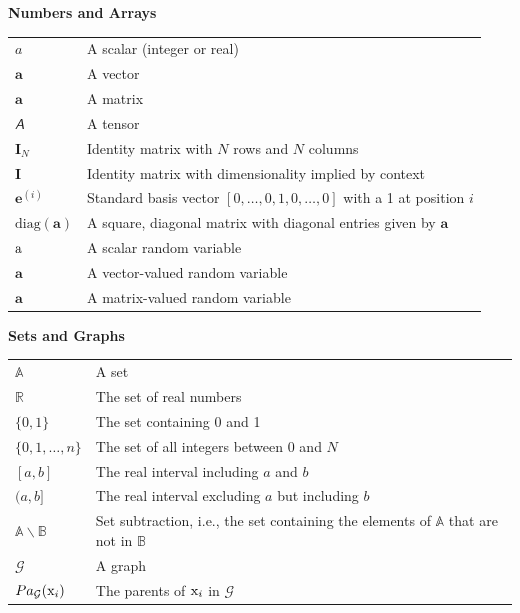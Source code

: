 \documentclass[twoside]{article}
\renewcommand{\arraystretch}{1.6}
\theoremstyle{plain}
\theoremstyle{definition}
\theoremstyle{plain}
\def\ra{{\textnormal{a}}}
\def\rva{{\mathbf{a}}}
\def\ervx{{\textnormal{x}}}
\def\va{{\bm{a}}}
\def\ve{{\bm{e}}}
\def\mI{{\bm{I}}}
\newcommand{\tens}[1]{\bm{\mathsfit{#1}}}
\def\tA{{\tens{A}}}
\def\gG{{\mathcal{G}}}
\def\sA{{\mathbb{A}}}
\def\sB{{\mathbb{B}}}
\newcommand{\R}{\mathbb{R}}
\newcommand{\parents}{Pa} %
\begin{document}
\centerline{\bf Numbers and Arrays}
\bgroup
\def\arraystretch{1.5}
\begin{tabular}{p{1in}p{3.25in}}
$\displaystyle a$ & A scalar (integer or real)\\
$\displaystyle \va$ & A vector\\
$\displaystyle \va$ & A matrix\\
$\displaystyle \tA$ & A tensor\\
$\displaystyle \mI_N$ & Identity matrix with $N$ rows and $N$ columns\\
$\displaystyle \mI$ & Identity matrix with dimensionality implied by context\\
$\displaystyle \ve^{(i)}$ & Standard basis vector $[0,\dots,0,1,0,\dots,0]$ with a 1 at position $i$\\
$\displaystyle \text{diag}(\va)$ & A square, diagonal matrix with diagonal entries given by $\va$\\
$\displaystyle \ra$ & A scalar random variable\\
$\displaystyle \rva$ & A vector-valued random variable\\
$\displaystyle \va$ & A matrix-valued random variable\\
\end{tabular}
\egroup
\vspace{0.25cm}

\centerline{\bf Sets and Graphs}
\bgroup
\def\arraystretch{1.5}

\begin{tabular}{p{1.25in}p{3.25in}}
$\displaystyle \sA$ & A set\\
$\displaystyle \R$ & The set of real numbers \\
$\displaystyle \{0, 1\}$ & The set containing 0 and 1 \\
$\displaystyle \{0, 1, \dots, n \}$ & The set of all integers between $0$ and $N$\\
$\displaystyle [a, b]$ & The real interval including $a$ and $b$\\
$\displaystyle (a, b]$ & The real interval excluding $a$ but including $b$\\
$\displaystyle \sA \backslash \sB$ & Set subtraction, i.e., the set containing the elements of $\sA$ that are not in $\sB$\\
$\displaystyle \gG$ & A graph\\
$\displaystyle \parents_\gG(\ervx_i)$ & The parents of $\ervx_i$ in $\gG$
\end{tabular}
\vspace{0.25cm}
\end{document}
